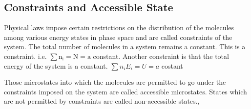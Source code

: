 \subsection{Constraints and Accessible State}
Physical laws impose certain restrictions on the distribution of the molecules among various energy states in phase space and are called constraints of the system. The total number of molecules in a system remains a constant. This is a constraint. i.e. $\sum \mathrm{n}_{\mathrm{i}}=\mathrm{N}=\mathrm{a}$ constant. Another constraint is that the total energy of the system is a constant. $\sum n_{i} E_{i}=U=a$ costant\\
\par Those microstates into which the molecules are permitted to go under the constraints imposed on the system are called accessible microstates. States which are not permitted by constraints are called non-accessible states., \\
